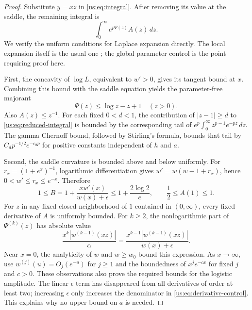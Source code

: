 \documentclass[11pt,a4paper]{article}
\numberwithin{equation}{section}
\theoremstyle{plain}
\theoremstyle{definition}
\theoremstyle{remark}
\begin{document}
\begin{proof}
Substitute $y=xz$ in \eqref{us:eq:integral}. After removing its
value at the saddle, the remaining integral is
\begin{equation}\label{us:eq:reduced-integral}
 \int_0^\infty e^{p\Psi(z)}A(z)\,dz.
\end{equation}
We verify the uniform conditions for Laplace expansion directly.
The local expansion itself is the usual one
\cite[\S2.3(iii)]{cont:DLMFLaplace}; the global parameter control is
the point requiring proof here.

First, the concavity of $\log L$, equivalent to $w'>0$, gives its
tangent bound at $x$. Combining this bound with the saddle equation
yields the parameter-free majorant
\begin{equation}\label{us:eq:majorant}
 \boxed{\displaystyle \Psi(z)\le\log z-z+1\quad(z>0).}
\end{equation}
Also $A(z)\le z^{-1}$. For each fixed $0<d<1$, the contribution
of $|z-1|\ge d$ to \eqref{us:eq:reduced-integral} is bounded by
the corresponding tail of
$e^p\int_0^\infty z^{p-1}e^{-pz}\,dz$.
The gamma Chernoff bound, followed by Stirling's formula, bounds
that tail by $C_dp^{-1/2}e^{-c_dp}$ for positive constants
independent of $h$ and $a$.

Second, the saddle curvature is bounded above and below uniformly.
For $r_x=(1+e^x)^{-1}$, logarithmic differentiation gives
$w'=w(w-1+r_x)$, hence $0<w'\le r_x\le e^{-x}$.
Therefore
\begin{equation}\label{us:eq:curvature-bound}
 1\le B=1+\frac{xw'(x)}{w(x)+\epsilon}
 \le1+\frac{2\log2}{e},
 \qquad \frac12\le A(1)\le1.
\end{equation}
For $z$ in any fixed closed neighborhood of $1$ contained in
$(0,\infty)$, every fixed derivative of $A$ is uniformly bounded.
For $k\ge2$, the nonlogarithmic part of $\Psi^{(k)}(z)$ has
absolute value
\begin{equation}\label{us:eq:derivative-control}
 \frac{x^k|w^{(k-1)}(xz)|}{\alpha}
 =\frac{x^{k-1}|w^{(k-1)}(xz)|}{w(x)+\epsilon}.
\end{equation}
Near $x=0$, the analyticity of $w$ and $w\ge w_0$ bound this
expression. As $x\to\infty$, use
$w^{(j)}(u)=O_j(e^{-u})$ for $j\ge1$ and the boundedness of
$x^je^{-cx}$ for fixed $j$ and $c>0$. These observations also
prove the required bounds for the logistic amplitude. The linear
$\epsilon$ term has disappeared from all derivatives of order
at least two; increasing $\epsilon$ only increases the denominator
in \eqref{us:eq:derivative-control}. This explains why no upper
bound on $a$ is needed.


\end{proof}
\end{document}
